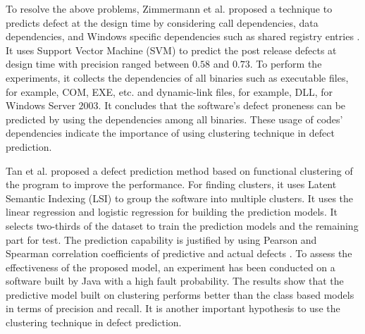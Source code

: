 \documentclass[12pt]{report}
\begin{document}
To resolve the above problems, Zimmermann et al. proposed a technique to predicts defect at the design time by considering call dependencies, data dependencies, and Windows specific dependencies such as shared registry entries \cite{zimmermann2007predicting}. It uses Support Vector Machine (SVM) to predict the post release defects at design time with precision ranged between $0.58$ and $0.73$. To perform the experiments, it collects the dependencies of all binaries such as executable files, for example, COM, EXE, etc. and dynamic-link files, for example, DLL, for Windows Server $2003$.  It concludes that the software's defect proneness can be predicted by using the dependencies among all binaries. These usage of codes' dependencies indicate the importance of using clustering technique in defect prediction. 

Tan et al. proposed a defect prediction method based on functional clustering of the program to improve the performance\cite{tan2011assessing}. For finding clusters, it uses Latent Semantic Indexing (LSI) to group the software into multiple clusters. It uses the linear regression and logistic regression for building the prediction models. It selects two-thirds of the dataset to train the prediction models and the remaining part for test. The prediction capability is justified by using Pearson and Spearman correlation coefficients of predictive and actual defects \cite{Sharon2008Lawner}. To assess the effectiveness of the proposed model, an experiment has been conducted on a software built by Java with a high fault probability. The results show that the predictive model built on clustering performs better than the class based models in terms of precision and recall. It is another important hypothesis to use the clustering technique in defect prediction.
\end{document}
